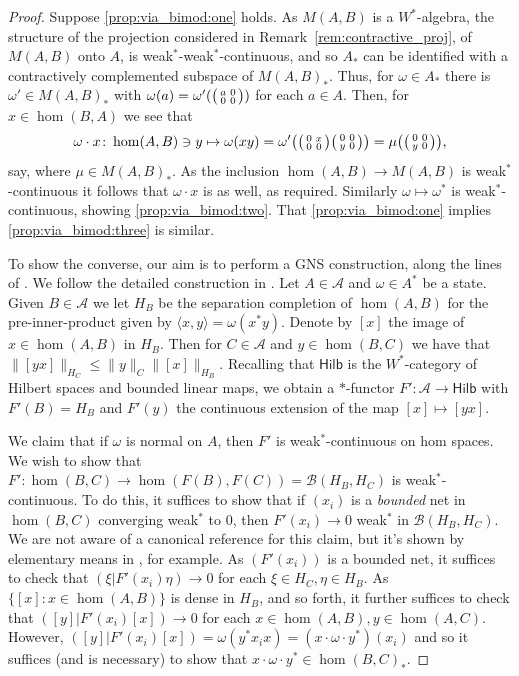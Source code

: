 \documentclass[a4paper,11pt]{article}
\theoremstyle{plain}
\theoremstyle{remark}
\newcommand{\mc}[1]{\mathcal{#1}}
\newcommand{\ip}[2]{{\langle {#1} , {#2} \rangle}}
\newcommand{\catHilb}{\textsf{Hilb}}
\newenvironment{smat}{\bigl(\begin{smallmatrix}}{\end{smallmatrix}\bigr)}
\newcommand{\smattwo}[4]{\begin{smat}{#1}&{#2}\\{#3}&{#4}\end{smat}}
\begin{document}
\begin{proof}
Suppose \ref{prop:via_bimod:one} holds.  As $M(A,B)$ is a $W^*$-algebra, the structure of the projection considered in Remark~\ref{rem:contractive_proj}, of $M(A,B)$ onto $A$, is weak$^*$-weak$^*$-continuous, and so $A_*$ can be identified with a contractively complemented subspace of $M(A,B)_*$.  Thus, for $\omega\in A_*$ there is $\omega' \in M(A,B)_*$ with $\omega(a) = \omega'(\smattwo{a}{0}{0}{0})$ for each $a\in A$.  Then, for $x\in \hom(B,A)$ we see that
\[ \omega\cdot x \colon \hom(A,B) \ni y \mapsto \omega(xy)
= \omega'\bigl( \smattwo{0}{x}{0}{0} \smattwo{0}{0}{y}{0}  \bigr)
= \mu \bigl(\smattwo{0}{0}{y}{0} \bigr), \]
say, where $\mu\in M(A,B)_*$.  As the inclusion $\hom(A,B) \to M(A,B)$ is weak$^*$-continuous it follows that $\omega\cdot x$ is as well, as required.  Similarly $\omega\mapsto\omega^*$ is weak$^*$-continuous, showing \ref{prop:via_bimod:two}.  That \ref{prop:via_bimod:one} implies \ref{prop:via_bimod:three} is similar.

To show the converse, our aim is to perform a GNS construction, along the lines of \cite[Proposition~1.8]{GLR_Wstar_categories}.  We follow the detailed construction in \cite[Section~6]{mitchener_cstar_cats}.  Let $A\in\mc A$ and $\omega\in A^*$ be a state.  Given $B\in\mc A$ we let $H_B$ be the separation completion of $\hom(A,B)$ for the pre-inner-product given by $\ip{x}{y} = \omega(x^*y)$.  Denote by $[x]$ the image of $x\in\hom(A,B)$ in $H_B$.  Then for $C\in\mc A$ and $y\in\hom(B,C)$ we have that $\| [yx] \|_{H_C} \leq \|y\|_C \|[x]\|_{H_B}$.  Recalling that $\catHilb$ is the $W^*$-category of Hilbert spaces and bounded linear maps, we obtain a $*$-functor $F' \colon \mc A \to \catHilb$ with $F'(B) = H_B$ and $F'(y)$ the continuous extension of the map $[x] \mapsto [yx]$.

We claim that if $\omega$ is normal on $A$, then $F'$ is weak$^*$-continuous on hom spaces.  We wish to show that $F' \colon \hom(B,C) \to \hom(F(B),F(C)) = \mc B(H_B, H_C)$ is weak$^*$-continuous.  To do this, it suffices to show that if $(x_i)$ is a \emph{bounded} net in $\hom(B,C)$ converging weak$^*$ to $0$, then $F'(x_i) \to 0$ weak$^*$ in $\mc B(H_B, H_C)$.  We are not aware of a canonical reference for this claim, but it's shown by elementary means in \cite[Section~10]{Daws_multipliers}, for example.  As $(F'(x_i))$ is a bounded net, it suffices to check that $(\xi|F'(x_i)\eta) \to 0$ for each $\xi\in H_C, \eta\in H_B$.  As $\{ [x] : x\in\hom(A,B)\}$ is dense in $H_B$, and so forth, it further suffices to check that $([y]|F'(x_i)[x]) \to 0$ for each $x\in\hom(A,B), y\in\hom(A,C)$.  However, $([y]|F'(x_i)[x]) = \omega(y^* x_i x) = (x\cdot\omega\cdot y^*)(x_i)$ and so it suffices (and is necessary) to show that $x\cdot\omega\cdot y^* \in \hom(B,C)_*$.


\end{proof}
\end{document}
